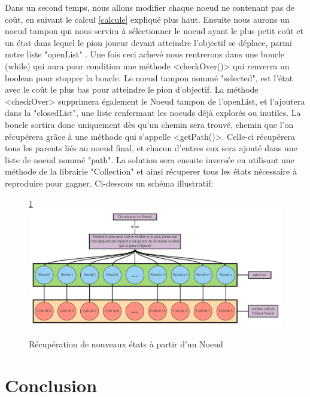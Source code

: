 \documentclass{rapportECL}
\begin{document}
\newpage

Dans un second temps, nous allons modifier chaque noeud ne contenant pas de coût, en suivant le calcul \ref{calcule} expliqué plus haut. Ensuite nous aurons un noeud tampon qui nous servira à sélectionner le noeud ayant le plus petit coût et un état dans lequel le pion joueur devant atteindre l'objectif se déplace, parmi notre liste "openList" . 
\newline
Une fois ceci achevé nous rentrerons dans une boucle (while) qui aura pour condition une méthode <checkOver()> qui renverra un boolean pour stopper la boucle. Le noeud tampon nommé "selected", est l'état avec le coût le plus bas pour atteindre le pion d'objectif.
\newline
La méthode <checkOver> supprimera  également  le Noeud tampon de l'openList, et l'ajoutera dans la "closedList", une liste renfermant les noeuds déjà explorés ou inutiles.  La boucle sortira donc uniquement dès qu'un chemin sera trouvé, chemin que l'on récupérera grâce à une méthode qui s'appelle <getPath()>.
\newline
Celle-ci récupérera tous les parents liés au noeud final, et chacun d'entres eux sera ajouté dans une liste de noeud nommé "path". La solution sera ensuite inversée en utilisant une méthode de la librairie "Collection"  et ainsi récuperer tous les états nécessaire à reproduire pour gagner. Ci-dessous un schéma illustratif: 

 \begin{figure}[h]
    \centering
    \ref{Fig8}
    \includegraphics[width=1\textwidth]{Graphique/Noeud.png}
    \caption{Récupération de nouveaux états à partir d'un Noeud}
    \label{Fig8}
\end{figure}

\newpage
\section{Conclusion}
\end{document}
